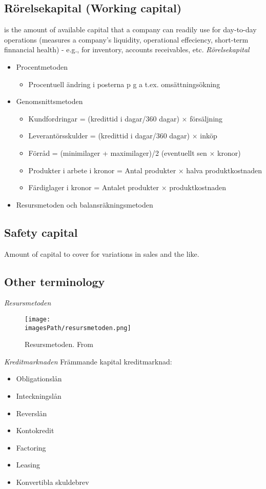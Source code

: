\subsection{Rörelsekapital (Working capital)}
is the amount of available capital that a company can readily use for 
day-to-day operations (measures a company's liquidity, operational effeciency,
short-term finnancial health) - e.g., for inventory, accounts receivables, etc.
\textit{Rörelsekapital}
\begin{itemize}
    \item Procentmetoden
    \begin{itemize}
        \item Procentuell ändring i posterna p g a t.ex. omsättningsökning
    \end{itemize}
    \item Genomsnittsmetoden
    \begin{itemize}
        \item Kundfordringar = (kredittid i dagar/360 dagar) $\times$ försäljning
        \item Leverantörsskulder = (kredittid i dagar/360 dagar) $\times$ inköp
        \item Förråd = (minimilager + maximilager)/2 (eventuellt sen $\times$ kronor)
        \item Produkter i arbete i kronor = Antal produkter $\times$ halva produktkostnaden
        \item Färdiglager i kronor = Antalet produkter $\times$ produktkostnaden
    \end{itemize}
    \item Resursmetoden och balansräkningsmetoden 
\end{itemize}

\subsection{Safety capital}
Amount of capital to cover for variations in sales and the like.

\subsection{Other terminology}
\textit{Resursmetoden}
\begin{figure}[H]
    \centering
    \texttt{[image: \\imagesPath/resursmetoden.png]}
    \caption{Resursmetoden. From \cite{im}}
\end{figure}

\textit{Kreditmarknaden} \newline
Främmande kapital kreditmarknad:
\begin{itemize}
    \item Obligationslån
    \item Inteckningslån 
    \item Reverslån 
    \item Kontokredit 
    \item Factoring
    \item Leasing 
    \item Konvertibla skuldebrev
\end{itemize}

